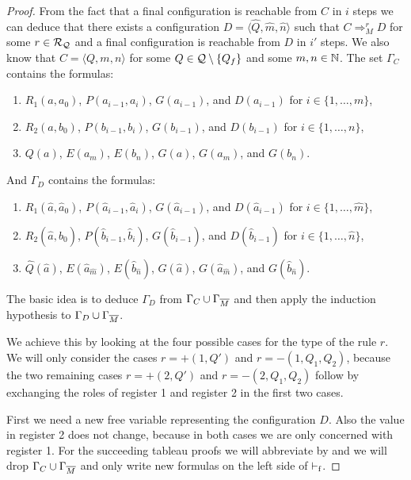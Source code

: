 \begin{proof}
	From the fact that a final configuration is reachable from $C$ in $i$ steps we can deduce that there exists a configuration $D=\langle \widehat{Q}, \widehat{m}, \widehat{n}\rangle$ such that $C\Rightarrow_M^r D$ for some $r\in\mathcal{R}_{\mathcal{Q}}$ and a final configuration is reachable from $D$ in $i'$ steps. We also know that $C=\langle Q,m,n\rangle$ for some $Q\in\mathcal{Q}\setminus\{Q_f\}$ and some $m,n\in\mathbb{N}$.
	The set $\Gamma_C$ contains the formulas: 
	\begin{enumerate}[label=]%
		\item $R_1(a,a_0)$, $P(a_{i-1},a_i)$, $G(a_{i-1})$, and $D(a_{i-1})$ for $i\in\{1,\dots,m\}$,
		\item $R_2(a,b_0)$, $P(b_{i-1},b_i)$, $G(b_{i-1})$, and $D(b_{i-1})$ for $i\in\{1,\dots,n\}$,
		\item $Q(a)$, $E(a_m)$, $E(b_n)$, $G(a)$, $G(a_m)$, and $G(b_n)$.
	\end{enumerate}
	And $\Gamma_D$ contains the formulas:
	\begin{enumerate}[label=]
		\item $R_1(\widehat{a},\widehat{a}_0)$, $P(\widehat{a}_{i-1},\widehat{a}_i)$, $G(\widehat{a}_{i-1})$, and $D(\widehat{a}_{i-1})$ for $i\in\{1,\dots,\widehat{m}\}$,
		\item $R_2(\widehat{a},\widehat{b}_0)$, $P(\widehat{b}_{i-1},\widehat{b}_i)$, $G(\widehat{b}_{i-1})$, and $D(\widehat{b}_{i-1})$ for $i\in\{1,\dots,\widehat{n}\}$,
		\item $\widehat{Q}(\widehat{a})$, $E({\widehat{a}}_{\widehat{m}})$, $E({\widehat{b}}_{\widehat{n}})$, $G(\widehat{a})$, $G({\widehat{a}}_{\widehat{m}})$, and $G({\widehat{b}}_{\widehat{n}})$.
	\end{enumerate}
	The basic idea is to deduce $\Gamma_D$ from $\Gamma_C\cup\Gamma_{\overline{M}}$ and then apply the induction hypothesis to $\Gamma_D\cup\Gamma_{\overline{M}}$. 
	
	\begin{figure}[H]
		\centering
		
	\end{figure}
	
	We achieve this by looking at the four possible cases for the type of the rule $r$. We will only consider the cases $r=+(1,Q')$ and $r=-(1,Q_1,Q_2)$, because the two remaining cases $r=+(2,Q')$ and $r=-(2,Q_1,Q_2)$ follow by exchanging the roles of register 1 and register 2 in the first two cases.
	
	First we need a new free variable representing the configuration $D$. Also the value in register 2 does not change, because in both cases we are only concerned with register 1.
	For the succeeding tableau proofs we will abbreviate \false{} by \falses{} and we will drop $\Gamma_C\cup\Gamma_{\overline{M}}$ and only write new formulas on the left side of $\vdash_\text{f}$.
	

\end{proof}
